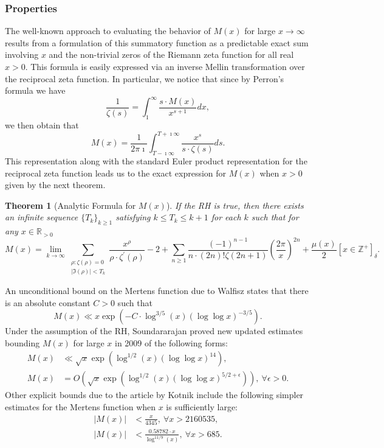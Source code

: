\documentclass[11pt,reqno,a4letter]{article}
\numberwithin{figure}{section}
\numberwithin{table}{section}
\newcommand{\Iverson}[1]{\ensuremath{\left[#1\right]_{\delta}}}
\theoremstyle{plain}
\newtheorem{theorem}{Theorem}
\numberwithin{theorem}{section}
\theoremstyle{definition}
\begin{document}
\subsubsection{Properties} 

The well-known approach to evaluating the behavior of $M(x)$ for large 
$x \rightarrow \infty$ results from a formulation of this summatory 
function as a predictable exact sum involving $x$ and the non-trivial 
zeros of the Riemann zeta function for all real $x > 0$. 
This formula is easily expressed via an inverse Mellin transformation 
over the reciprocal zeta function. In particular, 
we notice that since by Perron's formula we have 
\[
\frac{1}{\zeta(s)} = \int_1^{\infty} \frac{s \cdot M(x)}{x^{s+1}} dx, 
\]
we then obtain that 
\[
M(x) = \frac{1}{2\pi\imath} \int_{T-\imath\infty}^{T+\imath\infty} 
     \frac{x^s}{s \cdot \zeta(s)} ds. 
\] 
This representation along with the standard Euler product 
representation for the reciprocal zeta function leads us to the 
exact expression for $M(x)$ when $x > 0$ given by the next theorem. 

\begin{theorem}[Analytic Formula for $M(x)$] 
\label{theorem_MxMellinTransformInvFormula} 
If the RH is true, then there exists an infinite sequence 
$\{T_k\}_{k \geq 1}$ satisfying $k \leq T_k \leq k+1$ for each $k$ 
such that for any $x \in \mathbb{R}_{>0}$ 
\[
M(x) = \lim_{k \rightarrow \infty} 
     \sum_{\substack{\rho: \zeta(\rho) = 0 \\ |\Im(\rho)| < T_k}} 
     \frac{x^{\rho}}{\rho \cdot \zeta^{\prime}(\rho)} - 2 + 
     \sum_{n \geq 1} \frac{(-1)^{n-1}}{n \cdot (2n)! \zeta(2n+1)} 
     \left(\frac{2\pi}{x}\right)^{2n} + 
     \frac{\mu(x)}{2} \Iverson{x \in \mathbb{Z}^{+}}. 
\] 
\end{theorem} 

An unconditional bound on the Mertens function due to Walfisz 
\cite{see Ivic} states that there is an absolute constant $C > 0$ such that 
$$M(x) \ll x \exp\left(-C \cdot \log^{3/5}(x) 
  (\log\log x)^{-3/5}\right).$$ 
Under the assumption of the RH, Soundararajan proved new updated estimates 
bounding $M(x)$ for large $x$ in 2009 of the following forms: 
\begin{align*} 
M(x) & \ll \sqrt{x} \exp\left(\log^{1/2}(x) (\log\log x)^{14}\right), \\ 
M(x) & = O\left(\sqrt{x} \exp\left( 
     \log^{1/2}(x) (\log\log x)^{5/2+\epsilon}\right)\right),\ 
     \forall \epsilon > 0. 
\end{align*} 
Other explicit bounds due to the article by Kotnik include the following 
simpler estimates for the Mertens function when $x$ is sufficiently 
large: 
\begin{align*} 
|M(x)| & < \frac{x}{4345},\ \forall x > 2160535, \\ 
|M(x)| & < \frac{0.58782 \cdot x}{\log^{11/9}(x)},\ \forall x > 685. 
\end{align*} 
\end{document}
